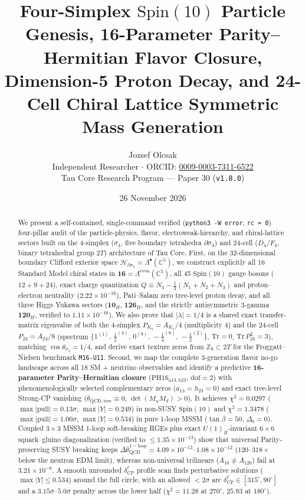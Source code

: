 \documentclass[11pt,a4paper]{article}
\title{\textbf{Four-Simplex $\mathrm{Spin}(10)$ Particle Genesis, 16-Parameter Parity--Hermitian Flavor Closure, Dimension-5 Proton Decay, and 24-Cell Chiral Lattice Symmetric Mass Generation}}
\author{Jozsef Olcsak\\[0.25em]
\small Independent Researcher $\cdot$ ORCID: \href{https://orcid.org/0009-0003-7311-6522}{0009-0003-7311-6522}\\
\small Tau Core Research Program --- Paper 30 (\texttt{v1.8.0})}
\date{26 November 2026}
\begin{document}
\maketitle

\begin{abstract}
We present a self-contained, single-command verified (\texttt{python3 -W error}, \texttt{rc = 0}) four-pillar audit of the particle-physics, flavor, electroweak-hierarchy, and chiral-lattice sectors built on the 4-simplex ($\sigma_4$, five boundary tetrahedra $\partial\sigma_4$) and 24-cell ($D_4/F_4$, binary tetrahedral group $2T$) architecture of Tau Core.
First, on the 32-dimensional boundary Clifford exterior space $\mathcal{H}_{\partial\sigma_4} = \Lambda^\bullet(\mathbb{C}^5)$, we construct explicitly all 16 Standard Model chiral states in $\mathbf{16} = \Lambda^{\mathrm{even}}(\mathbb{C}^5)$, all 45 $\mathrm{Spin}(10)$ gauge bosons ($12 + 9 + 24$), exact charge quantization $Q \equiv N_4 - \frac{1}{3}(N_1 + N_2 + N_3)$ and proton--electron neutrality ($2.22\times 10^{-16}$), Pati--Salam zero tree-level proton decay, and all three Higgs Yukawa sectors ($\mathbf{10}_H$, $\overline{\mathbf{126}}_H$, and the strictly antisymmetric 3-gamma $\mathbf{120}_H$, verified to $1.11\times 10^{-16}$). We also prove that $|\lambda| = 1/4$ is a shared exact transfer-matrix eigenvalue of both the 4-simplex $P_{K_5} = A_{K_5}/4$ (multiplicity 4) and the 24-cell $P_{24} = A_{24}/8$ (spectrum $\{1^{(1)},\, \tfrac{1}{2}^{(4)},\, 0^{(9)},\, -\tfrac{1}{4}^{(8)},\, -\tfrac{1}{2}^{(2)}\}$, $\mathrm{Tr}=0$, $\mathrm{Tr}\,P_{24}^2 = 3$), matching $\cos\theta_{\sigma_4} = 1/4$, and derive exact texture zeros from $\mathbb{Z}_6 \subset 2T$ for the Froggatt--Nielsen benchmark \texttt{M16-U11}.
Second, we map the complete 3-generation flavor no-go landscape across all 18 SM + neutrino observables and identify a predictive \textbf{16-parameter Parity--Hermitian closure} ($\mathrm{PH16}_{a13,h23}$, $\mathrm{dof} = 2$) with phenomenologically selected complementary zeros ($a_{13} = h_{23} = 0$) and exact tree-level Strong-CP vanishing ($\bar\theta_{\mathrm{QCD,tree}} \equiv 0$, $\det(M_u M_d) > 0$). It achieves $\chi^2 = 0.0297$ ($\max|\mathrm{pull}| = 0.13\sigma$, $\max|Y| = 0.249$) in non-SUSY $\mathrm{Spin}(10)$ and $\chi^2 = 1.3478$ ($\max|\mathrm{pull}| = 1.00\sigma$, $\max|Y| = 0.534$) in pure 1-loop MSSM ($\tan\beta = 50$, $\Delta_b = 0$). Coupled $3\times 3$ MSSM 1-loop soft-breaking RGEs plus exact $U(1)_R$-invariant $6\times 6$ squark--gluino diagonalization (verified to $\le 1.35\times 10^{-13}$) show that universal Parity-preserving SUSY breaking keeps $\Delta\bar\theta_{\mathrm{QCD}}^{\mathrm{1-loop}} = 4.09\times 10^{-13}\text{--}1.08\times 10^{-12}$ ($120\text{--}318\times$ below the neutron EDM limit), whereas non-universal trilinears ($A_{10}\neq A_{126}$) fail at $3.21\times 10^{-8}$. A smooth unrounded $\delta_{\mathrm{CP}}^\ell$ profile scan finds perturbative solutions ($\max|Y| \le 0.534$) around the full circle, with an allowed $<2\sigma$ arc $\delta_{\mathrm{CP}}^\ell \in [315^\circ, 90^\circ]$ and a $3.15\sigma$--$5.0\sigma$ penalty across the lower half ($\chi^2 = 11.28$ at $270^\circ$, $25.93$ at $180^\circ$).

\end{abstract}
\end{document}
